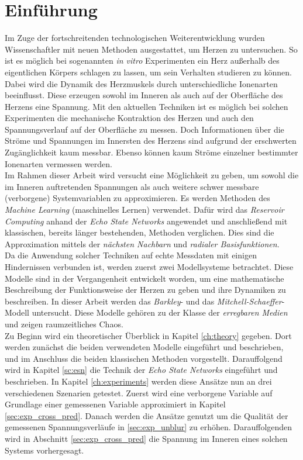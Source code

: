 \chapter{Einführung}
Im Zuge der fortschreitenden technologischen Weiterentwicklung wurden Wissenschaftler mit neuen Methoden ausgestattet, um Herzen zu untersuchen. So ist es möglich bei sogenannten \textit{in vitro} Experimenten ein Herz außerhalb des eigentlichen Körpers schlagen zu lassen, um sein Verhalten studieren zu können. Dabei wird die Dynamik des Herzmuskels durch unterschiedliche Ionenarten beeinflusst. Diese erzeugen sowohl im Inneren als auch auf der Oberfläche des Herzens eine Spannung. Mit den aktuellen Techniken ist es möglich bei solchen Experimenten die mechanische Kontraktion des Herzen und auch den Spannungsverlauf auf der Oberfläche zu messen. Doch Informationen über die Ströme und Spannungen im Innersten des Herzens sind aufgrund der erschwerten Zugänglichkeit kaum messbar. Ebenso können kaum Ströme einzelner bestimmter Ionenarten vermessen werden. \\

Im Rahmen dieser Arbeit wird versucht eine Möglichkeit zu geben, um sowohl die im Inneren auftretenden Spannungen als auch weitere schwer messbare (verborgene) Systemvariablen zu approximieren. Es werden Methoden des \textit{Machine Learning} (maschinelles Lernen) verwendet. Dafür wird das \textit{Reservoir Computing} anhand der \textit{Echo State Networks} angewendet und anschließend mit klassischen, bereits länger bestehenden, Methoden verglichen. Dies sind die Approximation mittels der \textit{nächsten Nachbarn} und \textit{radialer Basisfunktionen}.\\
  
Da die Anwendung solcher Techniken auf echte Messdaten mit einigen Hindernissen verbunden ist, werden zuerst zwei Modellsysteme betrachtet. Diese Modelle sind in der Vergangenheit entwickelt worden, um eine mathematische Beschreibung der Funktionsweise der Herzen zu geben und ihre Dynamiken zu beschreiben. In dieser Arbeit werden das \textit{Barkley}- und das \textit{Mitchell-Schaeffer}-Modell untersucht. Diese Modelle gehören zu der Klasse der \textit{erregbaren Medien} und zeigen raumzeitliches Chaos.\\

Zu Beginn wird ein theoretischer Überblick in Kapitel \ref{ch:theory} gegeben. Dort werden zunächst die beiden verwendeten Modelle eingeführt und beschrieben, und im Anschluss die beiden klassischen Methoden vorgestellt. Darauffolgend wird in Kapitel \ref{sc:esn} die Technik der \textit{Echo State Networks} eingeführt und beschrieben. In Kapitel \ref{ch:experiments} werden diese Ansätze nun an drei verschiedenen Szenarien getestet. Zuerst wird eine verborgene Variable auf Grundlage einer gemessenen Variable approximiert in Kapitel \ref{sec:exp_cross_pred}. Danach werden die Ansätze genutzt um die Qualität der gemessenen Spannungsverläufe in \ref{sec:exp_unblur} zu erhöhen. Darauffolgenden wird in Abschnitt \ref{sec:exp_cross_pred} die Spannung im Inneren eines solchen Systems vorhergesagt.\\

